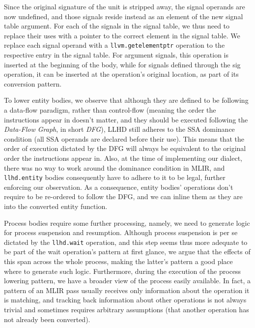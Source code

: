 Since the original signature of the unit is stripped away, the signal operands are now undefined, and those signals reside instead as an element of the new signal table argument. For each of the signals in the signal table, we thus need to replace their uses with a pointer to the correct element in the signal table. We replace each signal operand with a \texttt{llvm.getelementptr} operation to the respective entry in the signal table. For argument signals, this operation is inserted at the beginning of the body, while for signals defined through the sig operation, it can be inserted at the operation's original location, as part of its conversion pattern.

To lower entity bodies, we observe that although they are defined to be following a data-flow paradigm, rather than control-flow (meaning the order the instructions appear in doesn't matter, and they should be executed following the \textit{Data-Flow Graph}, in short \textit{DFG}), LLHD still adheres to the SSA dominance condition (all SSA operands are declared before their use). This means that the order of execution dictated by the DFG will always be equivalent to the original order the instructions appear in. Also, at the time of implementing our dialect, there was no way to work around the dominance condition in MLIR, and \texttt{llhd.entity} bodies consequently have to adhere to it to be legal, further enforcing our observation. As a consequence, entity bodies' operations don't require to be re-ordered to follow the DFG, and we can inline them as they are into the converted entity function.

Process bodies require some further processing, namely, we need to generate logic for process suspension and resumption. Although process suspension is per se dictated by the \texttt{llhd.wait} operation, and this step seems thus more adequate to be part of the wait operation's pattern at first glance, we argue that the effects of this span across the whole process, making the latter's pattern a good place where to generate such logic. Furthermore, during the execution of the process lowering pattern, we have a broader view of the process easily available. In fact, a pattern of an MLIR pass usually receives only information about the operation it is matching, and tracking back information about other operations is not always trivial and sometimes requires arbitrary assumptions (\eg that another operation has not already been converted).

